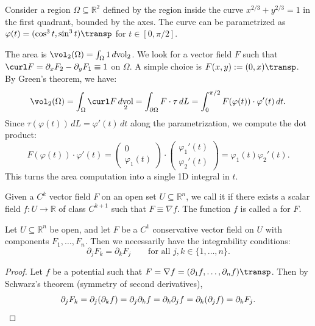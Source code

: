 \begin{example}
\label{ex:area_greens_theorem}
Consider a region $\Omega \subseteq \mathbb{R}^2$ defined by the region inside the curve $x^{2/3} + y^{2/3} = 1$ in the first quadrant, bounded by the axes. The curve can be parametrized as $\varphi(t) = (\cos^3 t, \sin^3 t)\transp$ for $t \in [0, \pi/2]$.

The area is $\vol_2(\Omega) = \int_\Omega 1 \mathop{d\text{vol}}_2$. We look for a vector field $F$ such that $\curl F = \partial_x F_2 - \partial_y F_1 \equiv 1$ on $\Omega$. A simple choice is $F(x,y) := (0, x)\transp$.
By Green's theorem, we have:
\[\vol_2(\Omega) = \int_\Omega \curl F \mathop{d\text{vol}}_2 = \int_{\partial\Omega} F \cdot \tau \,dL = \int_0^{\pi/2} F(\varphi(t)) \cdot \varphi'(t) \,dt.\]
Since $\tau(\varphi(t)) \,dL = \varphi'(t) \,dt$ along the parametrization, we compute the dot product:
\[F(\varphi(t)) \cdot \varphi'(t) = \begin{pmatrix} 0 \\ \varphi_1(t) \end{pmatrix} \cdot \begin{pmatrix} \varphi_1'(t) \\ \varphi_2'(t) \end{pmatrix} = \varphi_1(t)\varphi_2'(t).\]
This turns the area computation into a single 1D integral in $t$.
\end{example}

\begin{definition}
\label{def:conservative_field}
Given a $C^k$ vector field $F$ on an open set $U \subseteq \mathbb{R}^n$, we call it  if there exists a scalar field $f : U \to \mathbb{R}$ of class $C^{k+1}$ such that $F \equiv \nabla f$. The function $f$ is called a  for $F$.
\end{definition}

\begin{lemma}
\label{lem:integrability_conditions}
Let $U \subseteq \mathbb{R}^n$ be open, and let $F$ be a $C^1$ conservative vector field on $U$ with components $F_1, \dots, F_n$. Then we necessarily have the integrability conditions:
\[\partial_j F_k = \partial_k F_j \qquad \text{for all } j, k \in \{1,\dots,n\}.\]
\end{lemma}
\begin{proof}
Let $f$ be a potential such that $F = \nabla f = (\partial_1 f, \dots, \partial_n f)\transp$. Then by Schwarz's theorem (symmetry of second derivatives),
\[\partial_j F_k = \partial_j(\partial_k f) = \partial_j\partial_k f = \partial_k\partial_j f = \partial_k(\partial_j f) = \partial_k F_j.\qedhere\]
\end{proof}

